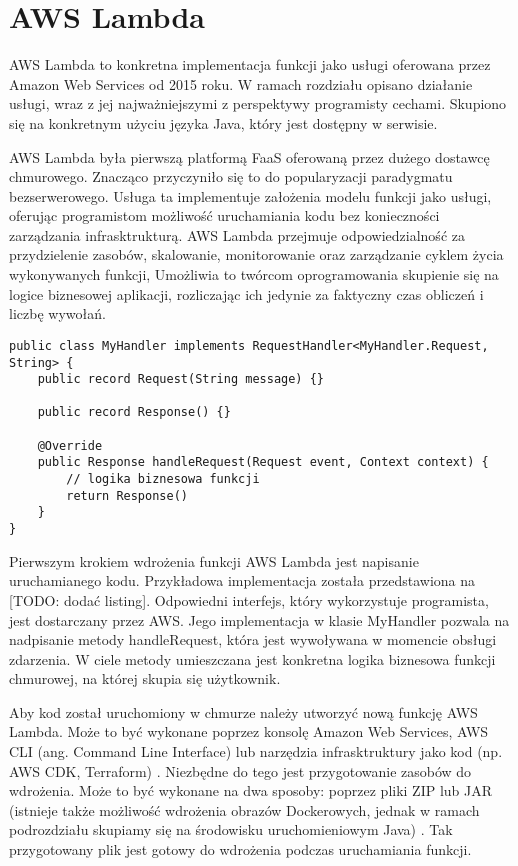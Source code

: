 \section{AWS Lambda}\label{chapter:aws_lambda}

AWS Lambda to konkretna implementacja funkcji jako usługi oferowana przez Amazon Web Services od 2015 roku.
W ramach rozdziału opisano działanie usługi, wraz z jej najważniejszymi z perspektywy programisty cechami.
Skupiono się na konkretnym użyciu języka Java, który jest dostępny w serwisie.

AWS Lambda była pierwszą platformą FaaS oferowaną przez dużego dostawcę chmurowego.
Znacząco przyczyniło się to do popularyzacji paradygmatu bezserwerowego.
Usługa ta implementuje założenia modelu funkcji jako usługi, oferując programistom możliwość uruchamiania kodu bez konieczności zarządzania infrasktrukturą.
AWS Lambda przejmuje odpowiedzialność za przydzielenie zasobów, skalowanie, monitorowanie oraz zarządzanie cyklem życia wykonywanych funkcji,
Umożliwia to twórcom oprogramowania skupienie się na logice biznesowej aplikacji, rozliczając ich jedynie za faktyczny czas obliczeń i liczbę wywołań.

\begin{lstlisting}[caption={Przykładowa implementacja funkcji AWS Lambda w języku Java [źródło: opracowanie własne]} label={code:example_aws_lambda}]
public class MyHandler implements RequestHandler<MyHandler.Request, String> {
    public record Request(String message) {}

    public record Response() {}

    @Override
    public Response handleRequest(Request event, Context context) {
        // logika biznesowa funkcji
        return Response()
    }
}
\end{lstlisting}

Pierwszym krokiem wdrożenia funkcji AWS Lambda jest napisanie uruchamianego kodu.
Przykładowa implementacja została przedstawiona na [TODO: dodać listing]. 
Odpowiedni interfejs, który wykorzystuje programista, jest dostarczany przez AWS.
Jego implementacja w klasie MyHandler pozwala na nadpisanie metody handleRequest, która jest wywoływana w momencie obsługi zdarzenia.
W ciele metody umieszczana jest konkretna logika biznesowa funkcji chmurowej, na której skupia się użytkownik.

Aby kod został uruchomiony w chmurze należy utworzyć nową funkcję AWS Lambda.
Może to być wykonane poprzez konsolę Amazon Web Services, AWS CLI (ang. Command Line Interface) lub narzędzia infrasktruktury jako kod (np. AWS CDK, Terraform) \cite{awsLambdaDocs}.
Niezbędne do tego jest przygotowanie zasobów do wdrożenia.
Może to być wykonane na dwa sposoby: poprzez pliki ZIP lub JAR (istnieje także możliwość wdrożenia obrazów Dockerowych, jednak w ramach podrozdziału skupiamy się na środowisku uruchomieniowym Java) \cite{awsLambdaDocs}.
Tak przygotowany plik jest gotowy do wdrożenia podczas uruchamiania funkcji.

